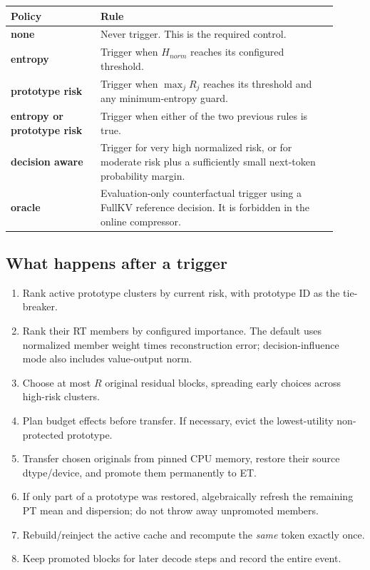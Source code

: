 \documentclass[11pt]{article}
\begin{document}
\begin{longtable}{>{\bfseries}p{0.25\linewidth}p{0.66\linewidth}}
\toprule
Policy & Rule \\
\midrule
\endhead
none & Never trigger. This is the required control. \\
entropy & Trigger when $H_{norm}$ reaches its configured threshold. \\
prototype risk & Trigger when $\max_j R_j$ reaches its threshold and any minimum-entropy guard. \\
entropy or prototype risk & Trigger when either of the two previous rules is true. \\
decision aware & Trigger for very high normalized risk, or for moderate risk plus a sufficiently
small next-token probability margin. \\
oracle & Evaluation-only counterfactual trigger using a FullKV reference decision. It is forbidden
in the online compressor. \\
\bottomrule
\end{longtable}

\subsection{What happens after a trigger}

\begin{enumerate}
  \item Rank active prototype clusters by current risk, with prototype ID as the tie-breaker.
  \item Rank their RT members by configured importance. The default uses normalized member weight
        times reconstruction error; decision-influence mode also includes value-output norm.
  \item Choose at most $R$ original residual blocks, spreading early choices across high-risk
        clusters.
  \item Plan budget effects before transfer. If necessary, evict the lowest-utility non-protected
        prototype.
  \item Transfer chosen originals from pinned CPU memory, restore their source dtype/device, and
        promote them permanently to ET.
  \item If only part of a prototype was restored, algebraically refresh the remaining PT mean and
        dispersion; do not throw away unpromoted members.
  \item Rebuild/reinject the active cache and recompute the \emph{same} token exactly once.
  \item Keep promoted blocks for later decode steps and record the entire event.
\end{enumerate}
\end{document}
